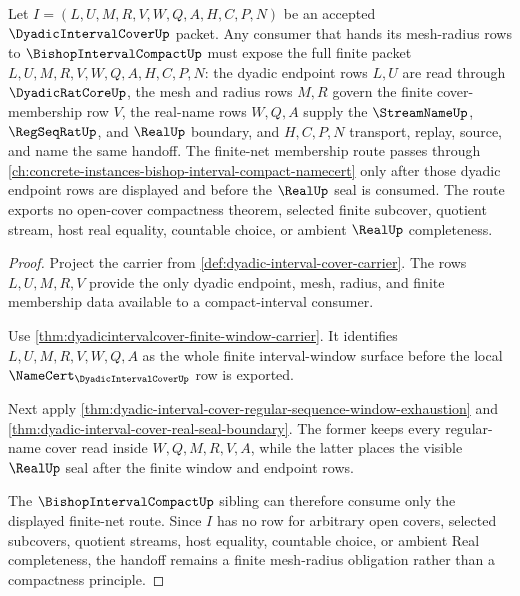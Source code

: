 \begin{theorem}
\label{thm:dyadicintervalcover-bishop-interval-compact-handoff}
Let $I=(L,U,M,R,V,W,Q,A,H,C,P,N)$ be an accepted $\DyadicIntervalCoverUp$ packet. Any consumer that hands its mesh-radius rows to $\BishopIntervalCompactUp$ must expose the full finite packet $L,U,M,R,V,W,Q,A,H,C,P,N$: the dyadic endpoint rows $L,U$ are read through $\DyadicRatCoreUp$, the mesh and radius rows $M,R$ govern the finite cover-membership row $V$, the real-name rows $W,Q,A$ supply the $\StreamNameUp$, $\RegSeqRatUp$, and $\RealUp$ boundary, and $H,C,P,N$ transport, replay, source, and name the same handoff. The finite-net membership route passes through \autoref{ch:concrete-instances-bishop-interval-compact-namecert} only after those dyadic endpoint rows are displayed and before the $\RealUp$ seal is consumed. The route exports no open-cover compactness theorem, selected finite subcover, quotient stream, host real equality, countable choice, or ambient $\RealUp$ completeness.
\end{theorem}
\begin{proof}
Project the carrier from \autoref{def:dyadic-interval-cover-carrier}. The rows $L,U,M,R,V$ provide the only dyadic endpoint, mesh, radius, and finite membership data available to a compact-interval consumer.

Use \autoref{thm:dyadicintervalcover-finite-window-carrier}. It identifies $L,U,M,R,V,W,Q,A$ as the whole finite interval-window surface before the local $\NameCert_{\DyadicIntervalCoverUp}$ row is exported.

Next apply \autoref{thm:dyadic-interval-cover-regular-sequence-window-exhaustion} and \autoref{thm:dyadic-interval-cover-real-seal-boundary}. The former keeps every regular-name cover read inside $W,Q,M,R,V,A$, while the latter places the visible $\RealUp$ seal after the finite window and endpoint rows.

The $\BishopIntervalCompactUp$ sibling can therefore consume only the displayed finite-net route. Since $I$ has no row for arbitrary open covers, selected subcovers, quotient streams, host equality, countable choice, or ambient Real completeness, the handoff remains a finite mesh-radius obligation rather than a compactness principle.
\end{proof}

